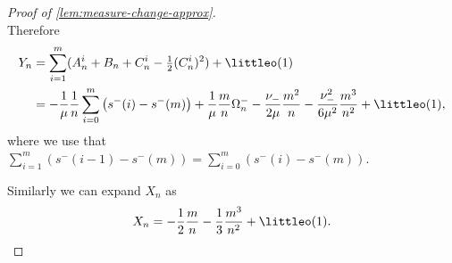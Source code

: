 \begin{proof}[Proof of \cref{lem:measure-change-approx}]
\begin{equation*}
    \end{equation*}
    Therefore
    \begin{align*}
        Y_n
        &= \sum_{i=1}^m (A_n^i + B_n + C_n^i - \tfrac{1}{2} (C_n^i)^2) + \littleo(1) \\
        &= - \frac{1}{\mu} \frac{1}{n} \sum_{i=0}^m \left( s^-(i) - s^-(m) \right)
        + \frac{1}{\mu} \frac{m}{n} \Omega_n^-
        - \frac{\nu_-}{2\mu} \frac{m^2}{n} - \frac{\nu_-^2}{6 \mu^2} \frac{m^3}{n^2} + \littleo(1),
    \end{align*}
    where we use that $\sum_{i=1}^m \left( s^-(i-1) - s^-(m) \right) = \sum_{i=0}^m \left( s^-(i) - s^-(m) \right)$.

    Similarly we can expand $X_n$ as
    \begin{equation*}
        X_n = - \frac{1}{2} \frac{m}{n} - \frac{1}{3} \frac{m^3}{n^2} + \littleo(1).
    \end{equation*}


\end{proof}

